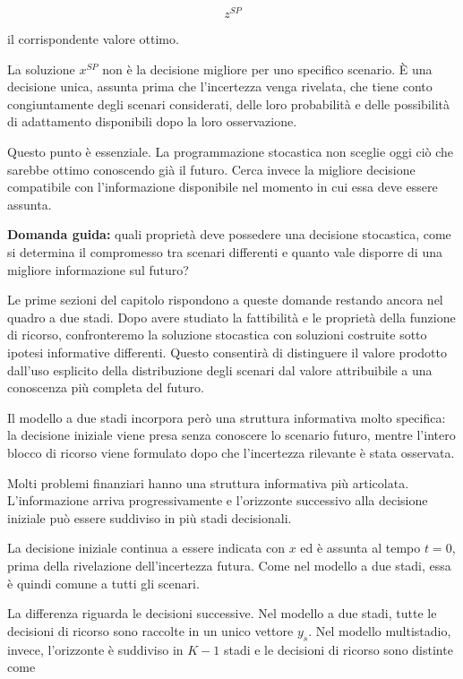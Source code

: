 \[
z^{SP}
\]

\noindent il corrispondente valore ottimo.

La soluzione $x^{SP}$ non \`e la decisione migliore per uno specifico
scenario. \`E una decisione unica, assunta prima che l'incertezza venga
rivelata, che tiene conto congiuntamente degli scenari considerati, delle loro
probabilit\`a e delle possibilit\`a di adattamento disponibili dopo la loro
osservazione.

Questo punto \`e essenziale. La programmazione stocastica non sceglie oggi
ci\`o che sarebbe ottimo conoscendo gi\`a il futuro. Cerca invece la migliore
decisione compatibile con l'informazione disponibile nel momento in cui essa
deve essere assunta.

\medskip

\noindent
\textbf{Domanda guida:} quali propriet\`a deve possedere una decisione
stocastica, come si determina il compromesso tra scenari differenti e quanto
vale disporre di una migliore informazione sul futuro?

\medskip

Le prime sezioni del capitolo rispondono a queste domande restando ancora nel
quadro a due stadi. Dopo avere studiato la fattibilit\`a e le propriet\`a
della funzione di ricorso, confronteremo la soluzione stocastica con soluzioni
costruite sotto ipotesi informative differenti. Questo consentir\`a di
distinguere il valore prodotto dall'uso esplicito della distribuzione degli
scenari dal valore attribuibile a una conoscenza pi\`u completa del futuro.

Il modello a due stadi incorpora per\`o una struttura informativa molto
specifica: la decisione iniziale viene presa senza conoscere lo scenario
futuro, mentre l'intero blocco di ricorso viene formulato dopo che
l'incertezza rilevante \`e stata osservata.

Molti problemi finanziari hanno una struttura informativa pi\`u articolata.
L'informazione arriva progressivamente e l'orizzonte successivo alla
decisione iniziale pu\`o essere suddiviso in pi\`u stadi decisionali.

La decisione iniziale continua a essere indicata con $x$ ed \`e assunta al
tempo $t=0$, prima della rivelazione dell'incertezza futura. Come nel modello
a due stadi, essa \`e quindi comune a tutti gli scenari.

La differenza riguarda le decisioni successive. Nel modello a due stadi, tutte
le decisioni di ricorso sono raccolte in un unico vettore $y_s$. Nel modello
multistadio, invece, l'orizzonte \`e suddiviso in $K-1$ stadi e le decisioni di
ricorso sono distinte come

